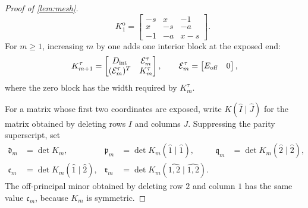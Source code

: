 \documentclass[review,hidelinks,onefignum,onetabnum]{siamart251216}
\begin{document}
\begin{proof}[Proof of \cref{lem:mesh}]
\[ \qquad
 K_1^{\mathrm o}=
 \begin{bmatrix}
 -s&x&-1\\
 x&-s&-a\\
 -1&-a&x-s
 \end{bmatrix}.
\]
For \(m\geq1\), increasing \(m\) by one adds one interior block at the
exposed end:
\begin{equation}\label{eq:fold-block-extension}
 K_{m+1}^\tau=
 \begin{bmatrix}
  D_{\rm int}&\mathcal E_m^\tau\\
  (\mathcal E_m^\tau)^T&K_m^\tau
 \end{bmatrix},
 \qquad
 \mathcal E_m^\tau=
 \begin{bmatrix}E_{\rm off}&0\end{bmatrix},
\end{equation}
where the zero block has the width required by \(K_m^\tau\).

For a matrix whose first two coordinates are exposed, write
\(K(\widehat I\mid\widehat J)\) for the matrix obtained by deleting
rows \(I\) and columns \(J\).  Suppressing the parity superscript, set
\[
\begin{aligned}
 \mathfrak d_m&=\det K_m,&
 \mathfrak p_m&=\det K_m(\widehat1\mid\widehat1),&
 \mathfrak q_m&=\det K_m(\widehat2\mid\widehat2),\\
 \mathfrak c_m&=\det K_m(\widehat1\mid\widehat2),&
 \mathfrak r_m&=\det K_m(\widehat{1,2}\mid\widehat{1,2}).
\end{aligned}
\]
The off-principal minor obtained by deleting row \(2\) and column \(1\)
has the same value \(\mathfrak c_m\), because \(K_m\) is symmetric.


\end{proof}
\end{document}

